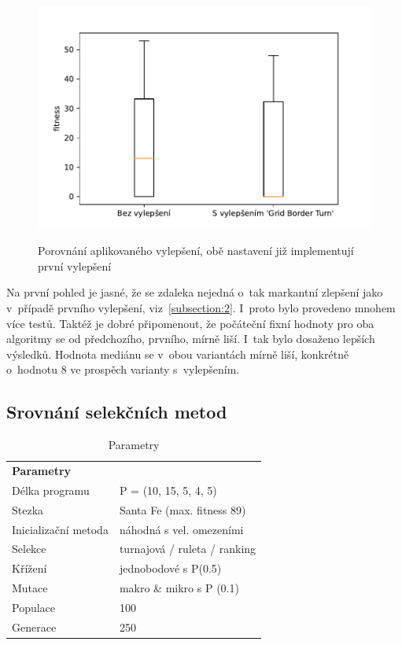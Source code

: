 \begin{figure}[!h]
    \centering
    \includegraphics[scale=0.8]{obrazky-figures/exp-lgp-improvement-2-wall.pdf}
    \label{fig:exp-lgp-improvement-2-wall}
    \caption{Porovnání aplikovaného vylepšení, obě nastavení již implementují první vylepšení}
\end{figure}

Na první pohled je jasné, že se zdaleka nejedná o~tak markantní zlepšení jako v~případě prvního vylepšení, viz~\ref{subsection:2}. I~proto bylo provedeno mnohem více testů. Taktéž je dobré připomenout, že počáteční fixní hodnoty pro oba algoritmy se od předchozího, prvního, mírně liší. I~tak bylo dosaženo lepších výsledků. Hodnota mediánu se v~obou variantách mírně liší, konkrétně o~hodnotu 8 ve prospěch varianty s~vylepšením.


\subsection{Srovnání selekčních metod}
\begin{table}[!h]
\centering
\begin{tabular}{ll}
\hline
\textbf{Parametry}      &             \\
Délka programu       & P = (10, 15, 5, 4, 5)  \\
Stezka               & Santa Fe (max. fitness 89)\\
Inicializační metoda & náhodná s vel. omezeními \\
Selekce              & turnajová / ruleta / ranking \\
Křížení              & jednobodové s P(0.5) \\
Mutace               & makro \& mikro s P (0.1)\\ 
Populace             & 100 \\ 
Generace             & 250 \\ \hline
\end{tabular}
\caption{Parametry}
\end{table}

